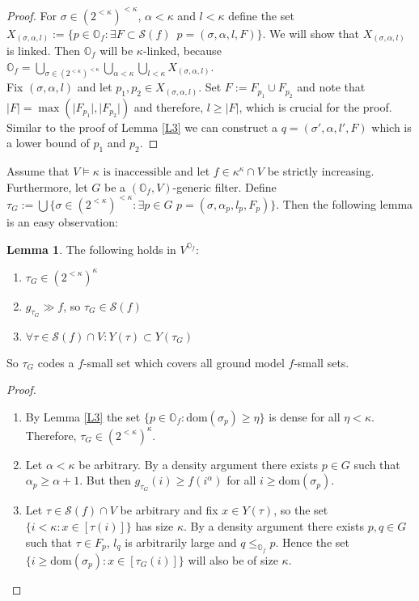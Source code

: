 \documentclass[12pt,a4paper]{scrartcl}
\theoremstyle{definition}
\newtheorem{lemma}[definition]{Lemma}
\numberwithin{equation}{section}
\begin{document}
\begin{proof}
For $\sigma \in (2^{<\kappa})^{<\kappa}$, $\alpha < \kappa$ and $l < \kappa$ define the set $X_{(\sigma, \alpha,l)}:=\{ p \in \mathbb{O}_f \colon \exists F \subset \mathcal{S}(f) \,\,\, p =(\sigma, \alpha,l,F)\}$. We will show that $X_{(\sigma, \alpha,l)}$ is linked. Then $\mathbb{O}_f$ will be $\kappa$-linked, because $\mathbb{O}_f=\bigcup_{\sigma \in (2^{<\kappa})^{<\kappa}} \bigcup_{\alpha < \kappa} \bigcup_{l< \kappa} X_{(\sigma, \alpha,l)}$.\\
Fix $(\sigma, \alpha,l)$ and let $p_1, p_2 \in  X_{(\sigma, \alpha,l)}$. Set $F:=F_{p_1} \cup F_{p_2}$ and note that $\vert F \vert =\max( \vert F_{p_1} \vert, \vert F_{p_2}\vert)$ and therefore, $l \geq \vert F\vert$, which is crucial for the proof. Similar to the proof of Lemma \ref{L3} we can construct a $q=(\sigma', \alpha, l', F)$ which is a lower bound of $p_1$ and $p_2$.
\end{proof}

Assume that $V \vDash \kappa \,\, \text{is inaccessible}$ and let $f \in \kappa^\kappa \cap V$ be strictly increasing. Furthermore, let $G$ be a $( \mathbb{O}_f , V)$-generic filter. Define $\tau_G:=\bigcup\{\sigma \in (2^{<\kappa})^{<\kappa}\colon \exists p \in G \, \, p=(\sigma, \alpha_p, l_p, F_p)\}$.  Then the following lemma is an easy observation:

\begin{lemma}
The following holds in $V^{{\mathbb{O}_f}}$:

\begin{enumerate}
\item $\tau_G \in (2^{<\kappa})^\kappa$
\item $g_{\tau_G} \gg f$, so $\tau_G \in \mathcal{S}(f)$
\item $ \forall \tau \in \mathcal{S}(f) \cap V \colon Y(\tau) \subset Y(\tau_G)$
\end{enumerate}
So $\tau_G$ codes a $f$-small set which covers all ground model $f$-small sets.
\end{lemma}

\begin{proof}
\begin{enumerate}
\item By Lemma \ref{L3} the set $\{p \in \mathbb{O}_f \colon \text{dom}(\sigma_p)\geq \eta\}$ is dense for all $\eta < \kappa$. Therefore, $\tau_G \in (2^{<\kappa})^\kappa$.
\item Let $\alpha <\kappa$ be arbitrary. By a density argument there exists $p \in G$ such that $\alpha_p \geq \alpha+1$. But then $g_{\tau_G}(i) \geq f(i^\alpha)$ for all $i \geq \text{dom}(\sigma_p)$.
\item Let $\tau \in \mathcal{S}(f) \cap V $ be arbitrary and fix $x \in Y(\tau)$, so the set $\{i <\kappa \colon x \in [\tau(i)]\}$ has size $\kappa$. By a density argument there exists $p,q \in G$ such that $\tau \in F_p$, $l_q$ is arbitrarily large and $q\leq_{\mathbb{O}_f} p$. Hence the set $\{i \geq \text{dom}(\sigma_p) \colon x \in [\tau_G(i)]\}$ will also be of size $\kappa$.
\end{enumerate}
\end{proof}
\end{document}
